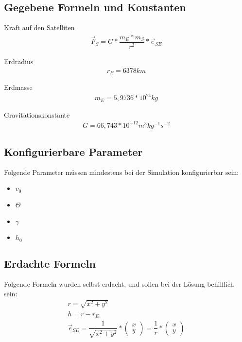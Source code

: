 \documentclass[]{scrartcl}
\begin{document}
\subsection{Gegebene Formeln und Konstanten}
Kraft auf den Satelliten
\begin{align}
\vec{F}_{S} = G * \dfrac{m_{E} * m_{S}}{r^2} * \vec{e}_{SE}
\end{align}

Erdradius
\begin{align}
r_{E} = 6378 km
\end{align}

Erdmasse
\begin{align}
m_{E} = 5,9736 * 10^{24} kg
\end{align}

Gravitationskonstante
\begin{align}
G = 66,743 * 10^{-12} m^{3} kg^{-1} s^{-2}
\end{align}

\subsection{Konfigurierbare Parameter}
Folgende Parameter müssen mindestens bei der Simulation konfigurierbar sein:
\begin{itemize}
\item $v_{0}$
\item $\Theta$
\item $\gamma$
\item $h_{0}$
\end{itemize}

\subsection{Erdachte Formeln}
Folgende Formeln wurden selbst erdacht, und sollen bei der Lösung behilflich sein:
\begin{align}
r = \sqrt{x^2 + y^2} \\
h = r - r_{E} \\
\vec{e}_{SE} = \dfrac{1}{\sqrt{x^2 + y^2}}* \begin{pmatrix}x\\y\end{pmatrix} = \dfrac{1}{r} * \begin{pmatrix}x\\y\end{pmatrix}
\end{align}
\end{document}

